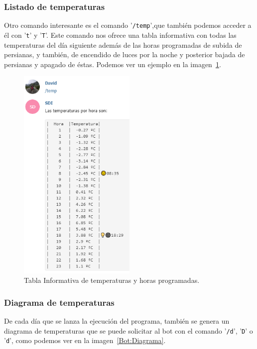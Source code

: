 \subsubsection{Listado de temperaturas}
Otro comando interesante es el comando '\texttt{/temp}',que también podemos acceder a él con '\texttt{t}' y '\texttt{T}'. Este comando nos ofrece una tabla informativa con todas las temperaturas del día siguiente además de las horas programadas de subida de persianas, y también, de encendido de luces por la noche y posterior bajada de persianas y apagado de éstas. Podemos ver un ejemplo en la imagen~\ref{Bot:tempHTML}.

\begin{figure}[h]
\centering
\includegraphics[width=0.5\textwidth]{img/SalidasBot/temperaturasHTML.PNG}
\caption{Tabla Informativa de temperaturas y horas programadas.}\label{Bot:tempHTML}
\end{figure}

\subsubsection{Diagrama de temperaturas}
De cada día que se lanza la ejecución del programa, también se genera un diagrama de temperaturas que se puede solicitar al bot con el comando '\texttt{/d}', '\texttt{D}' o '\texttt{d}', como podemos ver en la imagen~\ref{Bot:Diagrama}.

